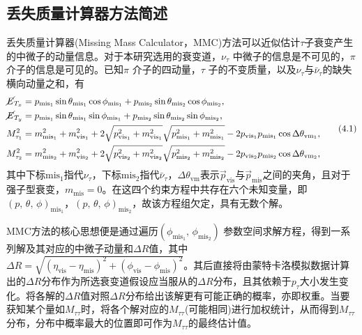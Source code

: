 \subsection{丢失质量计算器方法简述}
\label{sec:fourptwopone}
丢失质量计算器(Missing Mass Calculator，MMC)方法\cite{ref25}可以近似估计$\tau$子衰变产生的中微子的动量信息。对于本研究选用的衰变道，$\nu_{\tau}$ 中微子的信息是不可见的，$\pi$ 介子的信息是可见的。已知$\pi$ 介子的四动量，$\tau$ 子的不变质量，以及$\nu_{\tau}$与$\bar{\nu}_{\tau}$的缺失横向动量之和，有
\begin{equation*}
\begin{aligned}
\cancel{E}_{T_x} &=p_{\text{mis}_1} \sin \theta_{\text{mis}_1} \cos \phi_{\text{mis}_1} +p_{\text{mis}_2} \sin \theta_{\text{mis}_2} \cos \phi_{\text{mis}_2}\text{,}\\
\cancel{E}_{T_y} &=p_{\text{mis}_1} \sin \theta_{\text{mis}_1} \sin \phi_{\text{mis}_1} +p_{\text{mis}_2} \sin \theta_{\text{mis}_2} \sin \phi_{\text{mis}_2}\text{,}\\
M_{\tau_1}^2 &=m_{\text{mis}_1}^2 + m_{\text{vis}_1}^2 + 2 \sqrt{p_{\text{vis}_1}^2 +m_{\text{vis}_1}^2} \sqrt{p_{\text{mis}_1}^2 +m_{\text{mis}_1}^2} - 2p_{\text{vis}_1} p_{\text{mis}_1} \cos \Delta \theta_{\text{vm}_1}\text{,}\\
M_{\tau_2}^2 &=m_{\text{mis}_2}^2 + m_{\text{vis}_2}^2 + 2 \sqrt{p_{\text{vis}_2}^2 +m_{\text{vis}_2}^2} \sqrt{p_{\text{mis}_2}^2 +m_{\text{mis}_2}^2} - 2p_{\text{vis}_2} p_{\text{mis}_2} \cos \Delta \theta_{\text{vm}_2}\text{,}
\end{aligned}
\tag{4.1}
\end{equation*}
\noindent 其中下标$\text{mis}_1$指代$\nu_{\tau}$，下标$\text{mis}_2$指代$\bar{\nu}_{\tau} $，$\Delta \theta_{\text{vm}}$表示$\vec{p}_{\text{vis}}$与$\vec{p}_{\text{mis}}$之间的夹角，且对于强子型衰变，$m_{\text{mis}}=0$。在这四个约束方程中共存在六个未知变量，即$\left( p\text{, } \theta\text{, }\phi \right)_{\text{mis}_1}$，$\left( p\text{, } \theta \text{, }\phi \right)_{\text{mis}_2} $，故该方程组欠定，具有无数个解。

MMC方法的核心思想便是通过遍历$\left( \phi_{\text{mis}_1} \text{, } \phi_{\text{mis}_2} \right)$ 参数空间求解方程，得到一系列解及其对应的中微子动量和$\Delta R$值，其中$\Delta R=\sqrt{(\eta_{\text{vis}} -\eta_{\text{mis}})^2 + (\phi_{\text{vis}} -\phi_{\text{mis}})^2} $。其后直接将由蒙特卡洛模拟数据计算出的$\Delta R$分布作为所选衰变道假设应当服从的$\Delta R$分布，且其依赖于$p_{\tau}$大小发生变化。将各解的$\Delta R$值对照$\Delta R$分布给出该解更有可能正确的概率，亦即权重。当要获知某个量如$\textit{M}_{\tau \tau}$时，将各个解对应的$\textit{M}_{\tau \tau} $(可能相同)进行加权统计，从而得到$\textit{M}_{\tau \tau}$ 分布，分布中概率最大的位置即可作为$\textit{M}_{\tau \tau}$的最终估计值。

